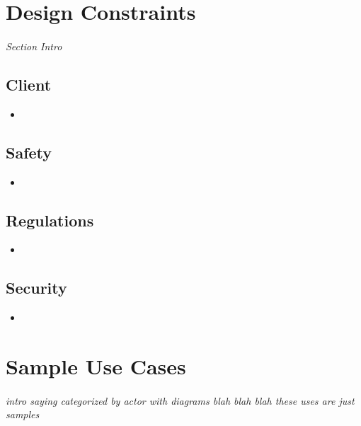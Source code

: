\documentclass[12pt]{article}
\begin{document}
\section{Design Constraints} \label{cons} %
\paragraph{} \textit{Section Intro}

	\subsection{Client}
	\begin{itemize}
		\item 
	\end{itemize}

	\subsection{Safety}
	\begin{itemize}
		\item 
	\end{itemize}

	\subsection{Regulations}
	\begin{itemize}
		\item 
	\end{itemize}

	\subsection{Security}
	\begin{itemize}
		\item 
	\end{itemize}

\section{Sample Use Cases}
\paragraph{} \textit{intro saying categorized by actor with diagrams blah blah blah these uses are just samples}

\end{document}
